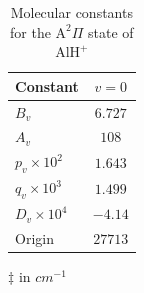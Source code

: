 \documentclass[twoside,twocolumn,9pt]{article}
\begin{document}
\begin{table}
\begin{minipage}[b]{0.45\linewidth}
\end{minipage}
\hspace{0.2cm}
\begin{minipage}[b]{0.45\linewidth}
\centering
\let\TPToverlap=\TPTrlap
\caption{Molecular constants for the $\mathrm{A}^2\Pi$ state of $\mathrm{AlH}^+$ \tnote{$\ddag$}}
\renewcommand{\arraystretch}{1.25}
\begin{threeparttable}
\setlength{\tabcolsep}{1em}
\begin{tabular}{lc}
 \hline
Constant                                  &                $ v=0$   \\
 \hline
$B_{v}$                                   &$6.727$ \cite{almy1934band}     \\   \hline
$A_{v}$                                   &$108$ \cite{almy1934band}        \\ \hline
$p_{v}\times 10^{2}$             &$1.643$ \cite{szajna2011high}    \\ \hline
$q_{v}\times 10^{3}$             &$1.499$ \cite{szajna2011high}    \\ \hline
$D_{v}\times 10^{4}$             &$-4.14$ \cite{almy1934band}     \\ \hline
Origin                                      &$27713$ \cite{szajna2011high}   \\ 
\hline
\end{tabular}
\begin{tablenotes}
\item[$\ddag$] in $cm^{-1}$
\end{tablenotes}
\end{threeparttable}
\label{Aparameters}
\end{minipage}
\end{table}
\end{document}
